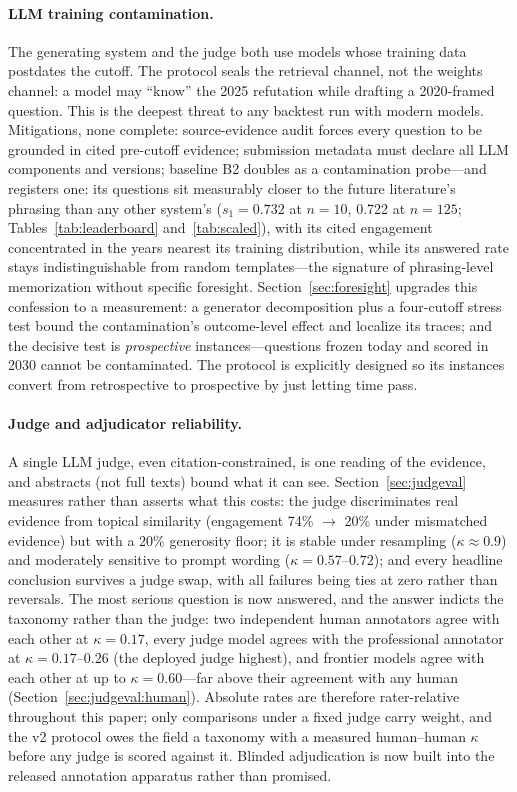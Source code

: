 \paragraph{LLM training contamination.} The generating system and the
judge both use models whose training data postdates the cutoff. The
protocol seals the retrieval channel, not the weights channel: a model
may ``know'' the 2025 refutation while drafting a 2020-framed question.
This is the deepest threat to any backtest run with modern models.
Mitigations, none complete: source-evidence audit forces every question
to be grounded in cited pre-cutoff evidence; submission metadata must
declare all LLM components and versions; baseline B2 doubles as a
contamination probe---and registers one: its questions sit measurably
closer to the future literature's phrasing than any other system's
($s_1 = 0.732$ at $n=10$, 0.722 at $n=125$;
Tables~\ref{tab:leaderboard} and~\ref{tab:scaled}), with its cited
engagement concentrated in the years nearest its training distribution,
while its answered rate stays indistinguishable from random
templates---the signature of phrasing-level memorization without
specific foresight. Section~\ref{sec:foresight} upgrades this
confession to a measurement: a generator decomposition plus a
four-cutoff stress test bound the contamination's outcome-level effect
and localize its traces; and the decisive test is \emph{prospective}
instances---questions frozen today and scored in 2030 cannot be
contaminated. The protocol is explicitly designed so its instances
convert from retrospective to prospective by just letting time pass.

\paragraph{Judge and adjudicator reliability.} A single LLM judge,
even citation-constrained, is one reading of the evidence, and
abstracts (not full texts) bound what it can see.
Section~\ref{sec:judgeval} measures rather than asserts what this
costs: the judge discriminates real evidence from topical similarity
(engagement 74\% $\to$ 20\% under mismatched evidence) but with a 20\%
generosity floor; it is stable under resampling ($\kappa\approx0.9$)
and moderately sensitive to prompt wording ($\kappa=0.57$--$0.72$);
and every headline conclusion survives a judge swap, with all failures
being ties at zero rather than reversals. The most serious question is now answered, and the answer indicts the
taxonomy rather than the judge: two independent human annotators agree
with each other at $\kappa=0.17$, every judge model agrees with the
professional annotator at $\kappa=0.17$--$0.26$ (the deployed judge
highest), and frontier models agree with each other at up to
$\kappa=0.60$---far above their agreement with any human
(Section~\ref{sec:judgeval:human}). Absolute rates are therefore
rater-relative throughout this paper; only comparisons under a fixed
judge carry weight, and the v2 protocol owes the field a taxonomy with
a measured human--human $\kappa$ before any judge is scored against
it. Blinded adjudication is now built into the released
annotation apparatus rather than promised.

